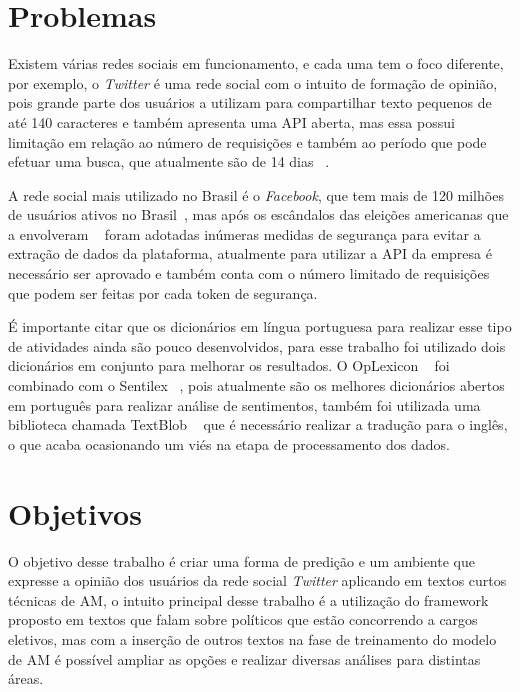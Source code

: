 %

\section{Problemas}

Existem várias redes sociais em funcionamento, e cada uma tem o foco diferente, por exemplo, o \textit{Twitter} é uma rede social com o intuito de formação de opinião, pois
grande parte dos usuários a utilizam para compartilhar texto pequenos de até 140 caracteres e também apresenta uma \acrshort{API} aberta, mas essa possui limitação 
em relação ao número de requisições e também ao período que pode efetuar uma busca, que atualmente são de 14 dias ~\cite{Twitter}.

A rede social mais utilizado no Brasil é o \textit{Facebook}, que tem mais de 120 milhões de usuários ativos no Brasil~\cite{EBC}, mas após os escândalos das eleições americanas que a envolveram ~\cite{face}
foram adotadas inúmeras medidas de segurança para evitar a extração de dados da plataforma, atualmente para utilizar a \acrshort{API} da empresa é necessário ser aprovado e também conta com o número limitado
de requisições que podem ser feitas por cada token de segurança.

É importante citar que os dicionários em língua portuguesa para realizar esse tipo de atividades ainda são pouco desenvolvidos, para esse trabalho foi utilizado dois dicionários em conjunto para melhorar 
os resultados. O OpLexicon ~\cite{souza} foi combinado com o Sentilex ~\cite{Neuenschwander}, pois atualmente são os melhores dicionários abertos em português para realizar análise de sentimentos, também foi utilizada
uma biblioteca chamada TextBlob ~\cite{textblob} que é necessário  realizar a tradução para o inglês, o que acaba ocasionando um viés na etapa de processamento dos dados.
\section{Objetivos}

O objetivo desse trabalho é criar uma forma de predição e um ambiente que expresse a opinião dos usuários da rede social \textit{Twitter} aplicando em textos curtos técnicas de \acrshort{AM},
o intuito principal desse trabalho é a utilização do framework proposto em textos que falam sobre políticos que estão concorrendo a cargos eletivos, mas com a inserção de outros textos na fase de treinamento do modelo de \acrshort{AM} é possível
ampliar as opções e realizar diversas análises para distintas áreas.


